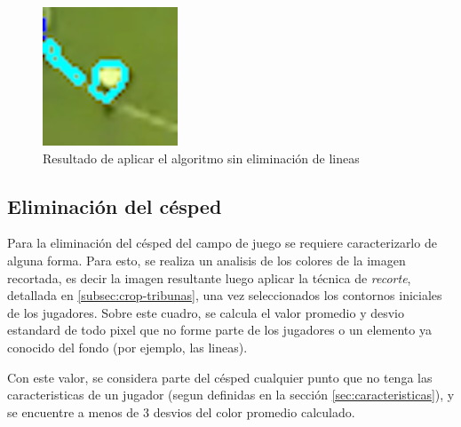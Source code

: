 \begin{figure}[H]
  \centering
    \begin{minipage}[t]{.45\textwidth}
      \includegraphics[width=\linewidth]{./images/confusion-linea.png}
      \caption{Resultado de aplicar el algoritmo sin eliminación de lineas
      \label{fig:confusion-linea}}
    \end{minipage}
\end{figure}

\subsection{Eliminación del césped}
\label{sec:cesped}

Para la eliminación del césped del campo de juego se requiere caracterizarlo
de alguna forma. Para esto, se realiza un analisis de los colores de
la imagen recortada, es decir la imagen resultante luego aplicar la técnica
de \textit{recorte}, detallada en \ref{subsec:crop-tribunas}, una vez seleccionados
los contornos iniciales de los jugadores. Sobre este cuadro, se calcula el valor
promedio y desvio estandard de todo pixel que no forme parte de los jugadores o
un elemento ya conocido del fondo (por ejemplo, las lineas).

Con este valor, se considera parte del césped cualquier punto que no tenga las
caracteristicas de un jugador (segun definidas en la sección \ref{sec:caracteristicas}),
y se encuentre a menos de 3 desvios del color promedio calculado.

